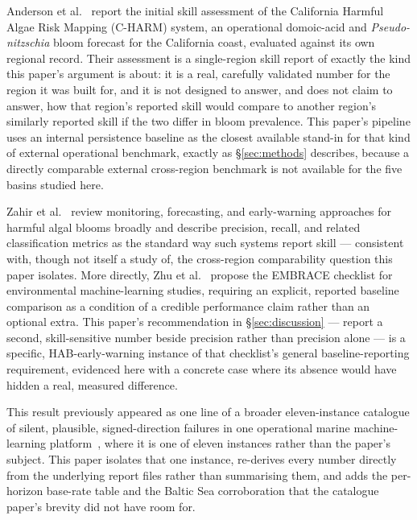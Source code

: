  Anderson et al.~\citep{charm2016} report the initial skill
assessment of the California Harmful Algae Risk Mapping (C-HARM) system, an
operational domoic-acid and \emph{Pseudo-nitzschia} bloom forecast for the
California coast, evaluated against its own regional record. Their
assessment is a single-region skill report of exactly the kind this paper's
argument is about: it is a real, carefully validated number for the region
it was built for, and it is not designed to answer, and does not claim to
answer, how that region's reported skill would compare to another region's
similarly reported skill if the two differ in bloom prevalence. This
paper's pipeline uses an internal persistence baseline as the closest
available stand-in for that kind of external operational benchmark, exactly
as \S\ref{sec:methods} describes, because a directly comparable
external cross-region benchmark is not available for the five basins studied
here.

 Zahir et
al.~\citep{zahir2024} review monitoring, forecasting, and early-warning
approaches for harmful algal blooms broadly and describe precision, recall,
and related classification metrics as the standard way such systems report
skill --- consistent with, though not itself a study of, the cross-region
comparability question this paper isolates. More directly, Zhu et
al.~\citep{embrace2024} propose the EMBRACE checklist for environmental
machine-learning studies, requiring an explicit, reported baseline
comparison as a condition of a credible performance claim rather than an
optional extra. This paper's recommendation in \S\ref{sec:discussion} ---
report a second, skill-sensitive number beside precision rather than
precision alone --- is a specific, HAB-early-warning instance of that
checklist's general baseline-reporting requirement, evidenced here with a
concrete case where its absence would have hidden a real, measured
difference.

 This result previously appeared as
one line of a broader eleven-instance catalogue of silent, plausible,
signed-direction failures in one operational marine machine-learning
platform~\citep{silentfailures2026}, where it is one of eleven instances
rather than the paper's subject. This paper isolates that one instance,
re-derives every number directly from the underlying report files rather
than summarising them, and adds the per-horizon base-rate table and the
Baltic Sea corroboration that the catalogue paper's brevity did not have
room for.

